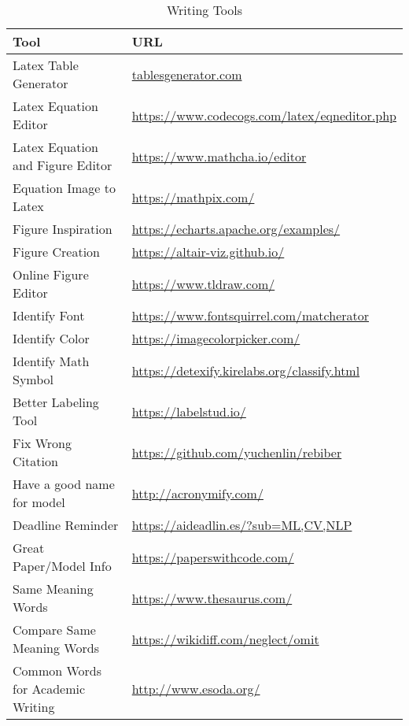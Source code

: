 \begin{table}
	\caption{Writing Tools}\label{tab:writing_tools}
	\begin{tabular}{ll}
		\toprule
		\textbf{Tool}                     & \textbf{URL}                                       \\
		\midrule
		Latex Table Generator             & \url{tablesgenerator.com}                          \\
		Latex Equation Editor             & \url{https://www.codecogs.com/latex/eqneditor.php} \\
		Latex Equation and Figure Editor  & \url{https://www.mathcha.io/editor}                \\
		Equation Image to Latex           & \url{https://mathpix.com/}                         \\
		Figure Inspiration                & \url{https://echarts.apache.org/examples/}         \\
		Figure Creation                   & \url{https://altair-viz.github.io/}                \\
		Online Figure Editor              & \url{https://www.tldraw.com/}                      \\
		Identify Font                     & \url{https://www.fontsquirrel.com/matcherator}     \\
		Identify Color                    & \url{https://imagecolorpicker.com/}                \\
		Identify Math Symbol              & \url{https://detexify.kirelabs.org/classify.html}  \\
		Better Labeling Tool              & \url{https://labelstud.io/}                        \\
		Fix Wrong Citation                & \url{https://github.com/yuchenlin/rebiber}         \\
		Have a good name for model        & \url{http://acronymify.com/}                       \\
		Deadline Reminder                 & \url{https://aideadlin.es/?sub=ML,CV,NLP}          \\
		Great Paper/Model Info            & \url{https://paperswithcode.com/}                  \\
		Same Meaning Words                & \url{https://www.thesaurus.com/}                   \\
		Compare Same Meaning Words        & \url{https://wikidiff.com/neglect/omit}            \\
		Common Words for Academic Writing & \url{http://www.esoda.org/}                        \\

\end{tabular}
\end{table}

